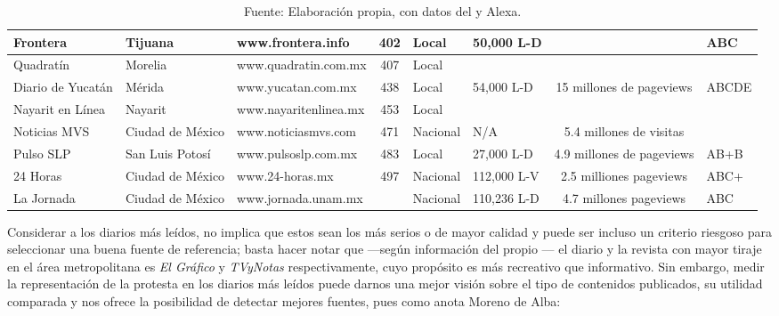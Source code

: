 \documentclass[letterpaper, 11pt]{book}
\theoremstyle{definition}
\theoremstyle{remark}
\begin{document}
\begin{table}[!hbt]
{\begin{tabular}{ | l | l | l | c | l | l | c | l | }
\hline
Frontera & Tijuana & www.frontera.info & 402 & Local & 50,000 L-D &  & ABC\\
\hline
Quadratín & Morelia & www.quadratin.com.mx & 407 & Local &  &  & \\
\hline
Diario de Yucatán & Mérida & www.yucatan.com.mx & 438 & Local & 54,000 L-D & 15 millones de pageviews & ABCDE\\
\hline
Nayarit en Línea & Nayarit & www.nayaritenlinea.mx & 453 & Local &  &  & \\
\hline
Noticias MVS & Ciudad de México & www.noticiasmvs.com & 471 & Nacional & N/A & 5.4 millones de visitas & \\
\hline
Pulso SLP & San Luis Potosí & www.pulsoslp.com.mx & 483 & Local & 27,000 L-D & 4.9 millones de pageviews & AB+B\\
\hline
24 Horas & Ciudad de México & www.24-horas.mx & 497 & Nacional & 112,000 L-V & 2.5 milliones pageviews & ABC+\\
\hline
La Jornada & Ciudad de México & www.jornada.unam.mx &  & Nacional & 110,236 L-D & 4.7 millones pageviews & ABC\\
\hline
\end{tabular}}
\par\bigskip
\caption*{\small Fuente: Elaboración propia, con datos del \citet{2016_INE_catalogoMedios} y Alexa.}
\end{table}
\addtocounter{footnote}{-1}
\addtocounter{footnote}{1}


Considerar a los diarios más leídos, no implica que estos sean los más serios o de mayor calidad y puede ser incluso un criterio riesgoso para seleccionar una buena fuente de referencia; basta hacer notar que ---según información del propio \citet{2016_INE_catalogoMedios}--- el diario y la revista con mayor tiraje en el área metropolitana es \emph{El Gráfico} y \emph{TVyNotas} respectivamente, cuyo propósito es más recreativo que informativo. 
Sin embargo, medir la representación de la protesta en los diarios más leídos puede darnos una mejor visión sobre el tipo de contenidos publicados, su utilidad comparada y nos ofrece la posibilidad de detectar mejores fuentes, pues como anota Moreno de Alba:
\end{document}
